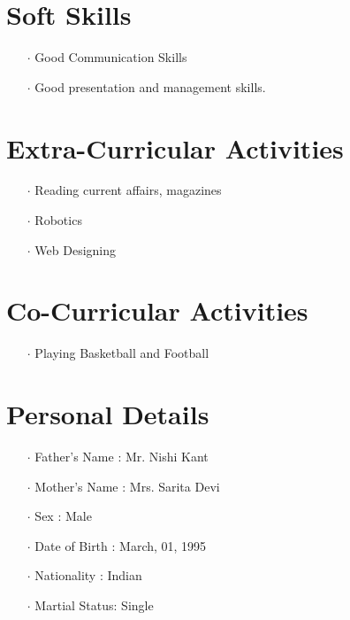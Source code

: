 \documentclass[11pt]{article}
\begin{document}
	\section*{Soft Skills}
	\begin{itemize}
		\item[$\cdot$] Good Communication Skills		\item[$\cdot$]Good presentation and management skills.
	\end{itemize}
	\section*{Extra-Curricular Activities}
	\begin{itemize}
		\item[$\cdot$]Reading current affairs, magazines
		\item[$\cdot$]Robotics
		\item[$\cdot$]Web Designing
	\end{itemize}
	\section*{Co-Curricular Activities}
	\begin{itemize}
		\item[$\cdot$] Playing Basketball and Football
	\end{itemize}
	\section*{Personal Details}
	\begin{itemize}
		\item[$\cdot$]Father's Name : Mr. Nishi Kant
		\item[$\cdot$]Mother's Name : Mrs. Sarita Devi
		\item[$\cdot$]Sex           : Male
		\item[$\cdot$]Date of Birth : March, 01, 1995
		\item[$\cdot$]Nationality   : Indian
		\item[$\cdot$]Martial Status: Single
	\end{itemize}

	
\end{document}
